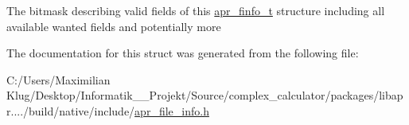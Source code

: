 The bitmask describing valid fields of this \mbox{\hyperlink{structapr__finfo__t}{apr\+\_\+finfo\+\_\+t}} structure including all available \textquotesingle{}wanted\textquotesingle{} fields and potentially more 

The documentation for this struct was generated from the following file\+:\begin{DoxyCompactItemize}
\item 
C\+:/\+Users/\+Maximilian Klug/\+Desktop/\+Informatik\+\_\+\_\+\+Projekt/\+Source/complex\+\_\+calculator/packages/libapr..../build/native/include/\mbox{\hyperlink{apr__file__info_8h}{apr\+\_\+file\+\_\+info.\+h}}\end{DoxyCompactItemize}

